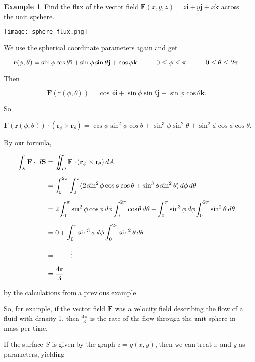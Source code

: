 \documentclass[11pt,oneside,english]{amsart}
\theoremstyle{definition}
\newtheorem*{example}{Example}
\newcommand{\pspace}{\hspace{10mm}}
\begin{document}
\begin{example}
Find the flux of the vector field $\mathbf{F}(x,y,z)=z\mathbf{i}+y\mathbf{j}+x\mathbf{k}$ across the unit spehere.

\begin{center}
\texttt{[image: sphere\_flux.png]}
\end{center}

We use the spherical coordinate parameters again and get

\[
\mathbf{r}(\phi,\theta)=\sin\phi\cos\theta\mathbf{i}+\sin\phi\sin\theta\mathbf{j}+\cos\phi\mathbf{k} \pspace 0\leq\phi\leq\pi \pspace 0\leq\theta\leq2\pi.
\]

Then

\[
\mathbf{F}(\mathbf{r}(\phi,\theta))=\cos\phi\mathbf{i}+\sin\phi\sin\theta\mathbf{j}+\sin\phi\cos\theta\mathbf{k}.
\]

So

\[
\mathbf{F}(\mathbf{r}(\phi,\theta))\cdot(\mathbf{r}_\phi\times\mathbf{r}_\theta)=\cos\phi\sin^2\phi\cos\theta+\sin^3\phi\sin^2\theta+\sin^2\phi\cos\phi\cos\theta.
\]

By our formula,

\begin{align*}
\int_S\mathbf{F}\cdot\,d\mathbf{S}&=\iint_D\mathbf{F}\cdot(\mathbf{r}_\phi\times\mathbf{r}_\theta)\,dA\\[2mm]
&=\int_0^{2\pi}\int_0^\pi(2\sin^2\phi\cos\phi\cos\theta+\sin^3\phi\sin^2\theta)\,d\phi\,d\theta\\[2mm]
&=2\int_0^\pi\sin^2\phi\cos\phi\,d\phi\int_0^{2\pi}\cos\theta\,d\theta+\int_0^\pi\sin^3\phi\,d\phi\int_0^{2\pi}\sin^2\theta\,d\theta\\[2mm]
&=0+\int_0^\pi\sin^3\phi\,d\phi\int_0^{2\pi}\sin^2\theta\,d\theta\\[2mm]
&=\hspace{8mm}\vdots\\[2mm]
&=\frac{4\pi}{3}
\end{align*}

by the calculations from a previous example.

So, for example, if the vector field $\mathbf{F}$ was a velocity field describing the flow of a fluid with density 1, then $\frac{4\pi}{3}$ is the rate of the flow through the unit sphere in mass per time.

\end{example}



If the surface $S$ is given by the graph $z=g(x,y)$, then we can treat $x$ and $y$ as parameters, yielding 
\end{document}
